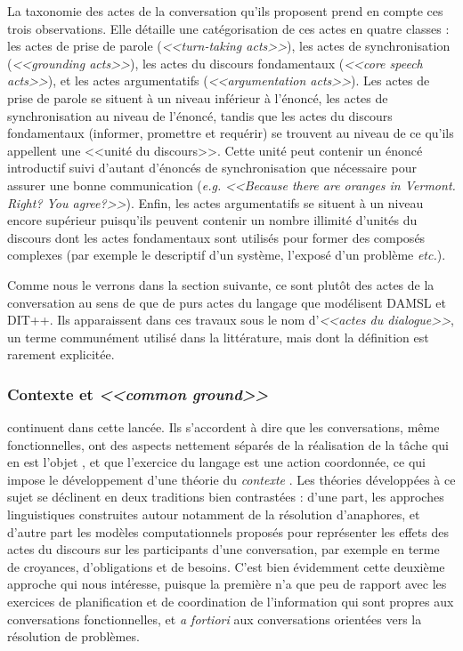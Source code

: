 \documentclass[10pt,a4paper,twoside]{article}
\begin{document}
La taxonomie des actes de la conversation qu'ils proposent prend en compte ces trois observations. Elle détaille une catégorisation de ces actes en quatre classes : les actes de prise de parole (\textit{<<turn-taking acts>>}), les actes de synchronisation (\textit{<<grounding acts>>}), les actes du discours fondamentaux (\textit{<<core speech acts>>}), et les actes argumentatifs (\textit{<<argumentation acts>>}). Les actes de prise de parole se situent à un niveau inférieur à l'énoncé, les actes de synchronisation au niveau de l'énoncé, tandis que les actes du discours fondamentaux (informer, promettre et requérir) se trouvent au niveau de ce qu'ils appellent une <<unité du discours>>. Cette unité peut contenir un énoncé introductif suivi d'autant d'énoncés de synchronisation que nécessaire pour assurer une bonne communication (\textit{e.g.} \textit{<<Because there are oranges in Vermont. Right? You agree?>>}). Enfin, les actes argumentatifs se situent à un niveau encore supérieur puisqu'ils peuvent contenir un nombre illimité d'unités du discours dont les actes fondamentaux sont utilisés pour former des composés complexes (par exemple le descriptif d'un système, l'exposé d'un problème \textit{etc.}).

Comme nous le verrons dans la section suivante, ce sont plutôt des actes de la conversation au sens de \citeauthor{traum1992conversation} que de purs actes du langage que modélisent DAMSL et DIT++. Ils apparaissent dans ces travaux sous le nom d'\textit{<<actes du dialogue>>}, un terme communément utilisé dans la littérature, mais dont la définition est rarement explicitée.

\subsubsection{Contexte et \textit{<<common ground>>}}

\citeauthor{poesio1997conversational} continuent dans cette lancée. Ils s'accordent à dire que les conversations, même fonctionnelles, ont des aspects nettement séparés de la réalisation de la tâche qui en est l'objet \cite{poesio1998towards}, et que l'exercice du langage est une action coordonnée, ce qui impose le développement d'une théorie du \textit{contexte} \cite{poesio1997conversational}. Les théories développées à ce sujet se déclinent en deux traditions bien contrastées : d'une part, les approches linguistiques construites autour notamment de la résolution d'anaphores, et d'autre part les modèles computationnels proposés pour représenter les effets des actes du discours sur les participants d'une conversation, par exemple en terme de croyances, d'obligations et de besoins. C'est bien évidemment cette deuxième approche qui nous intéresse, puisque la première n'a que peu de rapport avec les exercices de planification et de coordination de l'information qui sont propres aux conversations fonctionnelles, et \textit{a fortiori} aux conversations orientées vers la résolution de problèmes.
\end{document}
